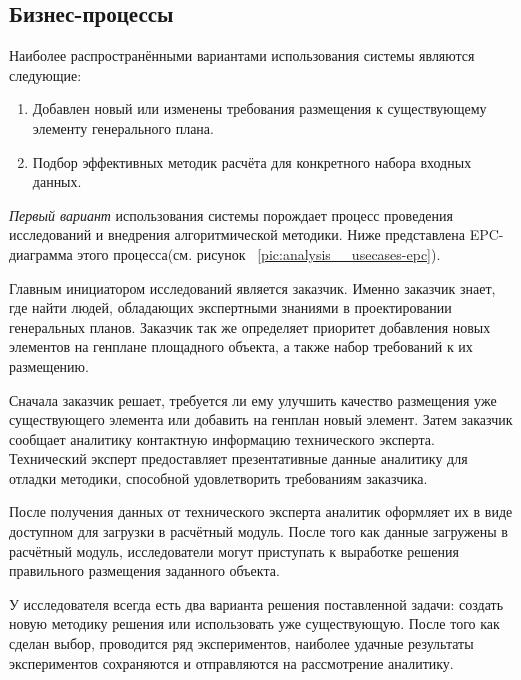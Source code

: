 \subsection{\large{Бизнес-процессы}}

Наиболее распространёнными вариантами использования системы являются следующие:
\begin{enumerate}
	\item Добавлен новый или изменены требования размещения к существующему элементу генерального плана.
	\item Подбор эффективных методик расчёта для конкретного набора входных данных.
\end{enumerate}

\textit{Первый вариант} использования системы порождает процесс проведения исследований и
внедрения алгоритмической методики.
Ниже представлена EPC-диаграмма этого процесса(см. рисунок \ \ref{pic:analysis__usecases-epc}).

Главным инициатором исследований является заказчик. Именно заказчик знает, где найти людей,
обладающих экспертными знаниями в проектировании генеральных планов.
Заказчик так же определяет приоритет добавления
новых элементов на генплане площадного объекта, а также набор требований к их размещению.

Сначала заказчик решает, требуется ли ему улучшить качество размещения уже существующего элемента
или добавить на генплан новый элемент. Затем заказчик сообщает аналитику контактную
информацию технического эксперта. Технический эксперт предоставляет презентативные данные аналитику для отладки методики,
способной удовлетворить требованиям заказчика.

После получения данных от технического эксперта аналитик оформляет их в виде доступном для загрузки в расчётный модуль.
После того как данные загружены в расчётный модуль, исследователи могут приступать к выработке решения
правильного размещения заданного объекта.

У исследователя всегда есть два варианта решения поставленной задачи: создать новую методику решения
или использовать уже существующую.
После того как сделан выбор, проводится ряд экспериментов,
наиболее удачные результаты экспериментов сохраняются и отправляются на рассмотрение аналитику.

